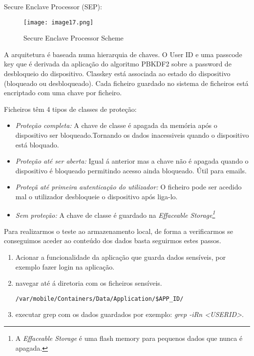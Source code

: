   Secure Enclave Processor (SEP):\par

\begin{figure}[H]
\centering
\texttt{[image: image17.png]}
\caption {Secure Enclave Processor Scheme}
\label {fig01}
\end{figure}

 		A arquitetura é baseada numa hierarquia de chaves.
 		O User ID e uma passcode key que é derivada da aplicação do algoritmo PBKDF2 sobre a password de desbloqueio do dispositivo. 
 		Classkey está associada ao estado do dispositivo (bloqueado ou desbloqueado).
 		Cada ficheiro guardado no sistema de ficheiros está encriptado com uma chave por ficheiro.\par


Ficheiros têm 4 tipos de classes de proteção:

\begin{itemize}
\item \textit{Proteção completa:}
		A chave de classe é apagada da memória após o dispositivo ser bloqueado.Tornando os dados inacessiveis quando o dispositivo está bloquado.\par
		\hfill\par

\item \textit{Proteção até ser aberta:}
		Igual á anterior mas a chave não é apagada quando o dispositivo é bloqueado permitindo acesso ainda bloqueado. Útil para emails.\par
		\hfill\par
\item \textit{Proteçã até primeira autenticação do utilizador:}
		O ficheiro pode ser acedido mal o utilizador desbloqueie o dispositivo após liga-lo.\par
		\hfill\par
\item \textit{Sem proteção:}
		A chave de classe é guardado na \textit{Effaceable Storage\footnote[0]{A \textit{Effaceable Storage} é uma flash memory para pequenos dados que nunca é apagada.}}\par
\end{itemize}


Para realizarmos o teste ao armazenamento local, de forma a verificarmos se conseguimos aceder ao conteúdo dos dados basta seguirmos estes passos.

\begin{enumerate}
\item Acionar a funcionalidade da aplicação que guarda dados sensíveis, por exemplo fazer login na aplicação.

\item navegar até á diretoria com os ficheiros sensíveis.
\begin{lstlisting}
/var/mobile/Containers/Data/Application/$APP_ID/
\end{lstlisting}
\item executar grep com os dados guardados por exemplo: \textit{grep -iRn <USERID>}.

\end{enumerate}

